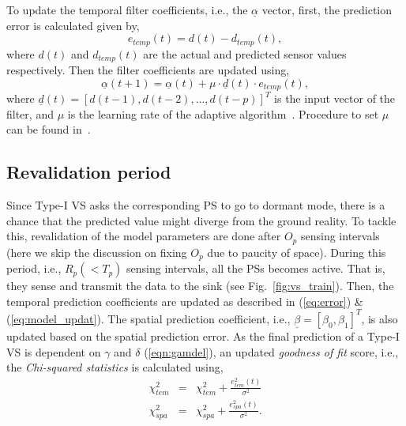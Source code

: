 \documentclass[a4paper,conference]{IEEEtran}
\begin{document}
To update the temporal filter coefficients, i.e., the $\underline{\alpha}$ vector, first, the prediction error is calculated given by,
\begin{equation}
e_{temp}(t)  =  d(t) - d_{temp}(t), \label{eq:error}
\end{equation}
where $d(t)$ and $d_{temp}(t)$ are the actual and predicted sensor values respectively. Then the filter coefficients are updated using,
\begin{equation}
\underline{\alpha}(t+1)  =  \underline{\alpha}(t) + \mu \cdot \underline{d}(t) \cdot e_{temp}(t), \label{eq:model_updat}
\end{equation}
where $\underline{d}(t) = [d(t-1), d(t-2), ..., d(t-p)]^{T}$ is the input vector of the filter, and $\mu$ is the learning rate of the adaptive algorithm~\cite{haykin2005adaptive}. Procedure to set $\mu$ can be found in~\cite{santini2006adaptive}. 
\subsection{Revalidation period}
\label{sec:rvp}
Since Type-I VS asks the corresponding PS to go to dormant mode, there is a chance that the predicted value might diverge from the ground reality. To tackle this, revalidation of the model parameters are done after $O_{p}$ sensing intervals (here we skip the discussion on fixing $O_{p}$ due to paucity of space). During this period, i.e., $R_{p} (<T_{p})$ sensing intervals, all the PSs becomes active. That is, they sense and transmit the data to the sink (see Fig.~\ref{fig:vs_train}). Then, the temporal prediction coefficients are updated as described in (\ref{eq:error}) \& (\ref{eq:model_updat}). The spatial prediction coefficient, i.e., $\underline{\beta} = [\beta_{0}, \beta_{1}]^{T}$, is also updated based on the spatial prediction error.
As the final prediction of a Type-I VS is dependent on $\gamma$ and $\delta$ (\ref{eqn:gamdel}), an updated {\it goodness of fit} score, i.e., the {\it Chi-squared statistics} is calculated using,
\begin{eqnarray}
\chi_{tem}^{2} & = & \chi_{tem}^{2} + \frac{e_{tem}^{2}(t)}{\sigma^{2}}  \\
\chi_{spa}^{2} & = & \chi_{spa}^{2} + \frac{e_{spa}^{2}(t)}{\sigma^{2}}. 
\end{eqnarray}
\end{document}
